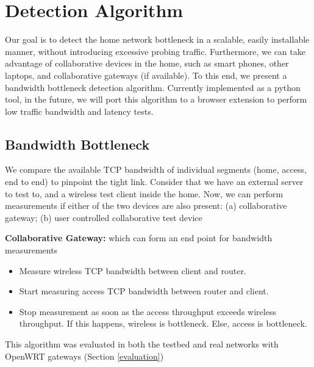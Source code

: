 \section{Detection Algorithm}

Our goal is to detect the home network bottleneck in a scalable, easily installable manner, without introducing excessive probing traffic. Furthermore, we can take advantage of collaborative devices in the home, such as smart phones, other laptops, and collaborative gateways (if available). To this end, we present a bandwidth bottleneck detection algorithm. Currently implemented as a python tool, in the future, we will port this algorithm to a browser extension to perform low traffic bandwidth and latency tests.

\subsection{Bandwidth Bottleneck}
\label{bandwidth}

We compare the available TCP bandwidth of individual segments (home, access, end to end) to pinpoint the tight link. Consider that we have an external server to test to, and a wireless test client inside the home. Now, we can perform measurements if either of the two devices are also present: (a) collaborative gateway; (b) user controlled collaborative test device

\textbf{Collaborative Gateway:} which can form an end point for bandwidth measurements
\begin{itemize}[noitemsep,topsep=0pt,parsep=0pt,partopsep=0pt]
\item Measure wireless TCP bandwidth between client and router.
\item Start measuring access TCP bandwidth between router and client.
\item Stop measurement as soon as the access throughput exceeds wireless throughput. If this happens, wireless is bottleneck. Else, access is bottleneck.
\end{itemize}
This algorithm was evaluated in both the testbed and real networks with OpenWRT gateways (Section \ref{evaluation})


